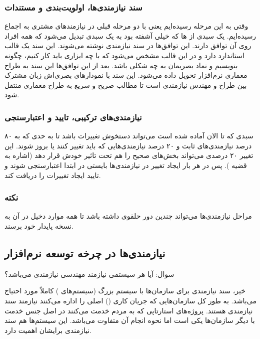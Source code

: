 \subsubsection{سند نیازمندی‌ها، اولویت‌بندی و مستندات}

وقتی به این مرحله رسیده‌ایم یعنی با دو مرحله قبلی در نیازمند‌های مشتری به اجماع
رسیده‌ایم. یک سبدی از ها که خیلی آشفته بود به یک سبدی تبدیل می‌شود که
همه افراد روی آن توافق دارند. این توافق‌ها در سند نیازمندی نوشته می‌شوند. این
سند یک قالب استاندارد دارد و در این قالب مشخص می‌شود که با چه ابزاری باید کار
کنیم، چگونه بنویسیم و نماد بصریمان به چه شکلی باشد. بعد از این توافق‌ها این سند
به طراح معماری نرم‌افزار تحویل داده می‌شود. این سند با نمودار‌های بصری‌اش زبان
مشترک بین طراح و مهندس نیازمندی است تا مطالب صریح و سریع به طراح معماری منتقل
شود.

\subsubsection{نیازمندی‌های ترکیبی،‌ تایید و اعتبارسنجی}

سبدی که تا الان آماده شده است می‌تواند دستخوش تغییرات باشد تا به حدی که به ۸۰
درصد نیازمندی‌های ثابت و ۲۰ درصد نیازمندی‌هایی که باید تغییر کنند یا بروز شوند.
این تغییر ۲۰ درصدی می‌تواند بخش‌های صحیح را هم تحت تاثیر خودش قرار دهد (اشاره به
قضیه ). پس در هر بار ایجاد تغییر در نیازمندی‌ها بایستی در ابتدا
اعتبارسنجی شوند و تایید ایجاد تغییرات را دریافت کند.

\subsubsection*{نکته}

مراحل نیازمندی‌ها می‌تواند چندین دور حلقوی داشته باشد تا همه موارد دخیل در آن به
نسخه پایدار خود برسند.

\subsection{نیازمندی‌ها در چرخه توسعه نرم‌افزار}

سوال: آیا هر سیستمی نیازمند مهندسی نیازمندی می‌باشد؟

خیر، سند نیازمندی برای سازمان‌ها با سیستم بزرگ (سیستم‌های ) کاملاً
مورد احتیاج می‌باشد. به طور کل سازمان‌هایی که جریان کاری () اصلی را
اداره می‌کنند نیازمند سند نیازمندی هستند. پروژه‌های استارتاپی که به مردم خدمت
می‌کنند در اصل جنس خدمت با دیگر سازمان‌ها یکی است اما نحوه انجام آن متفاوت
می‌باشد. این سیستم‌ها هم سند نیازمندی برایشان اهمیت دارد.

